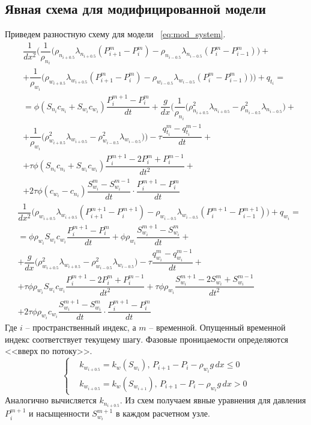 \subsection{Явная схема для модифицированной модели}
\label{mod_model_explicit}
Приведем разностную схему для модели ~\ref{eq:mod_system}.
\begin{eqnarray*} \label{eq:mod_scheme_p}
  & \dfrac{1}{dx^2} \bigg(\dfrac{1}{\rho_{n_i}} \big( \rho_{n_{i+0.5}} \lambda_{n_{i+0.5}} (P_{i+1}^m - P_i^m)
  - \rho_{n_{i-0.5}} \lambda_{n_{i-0.5}} (P_i^m - P_{i-1}^m)\big) + \\
  &+ \dfrac{1}{\rho_{w_i}} \big( \rho_{w_{i+0.5}} \lambda_{w_{i+0.5}} (P_{i+1}^m - P_i^m)
  - \rho_{w_{i-0.5}} \lambda_{w_{i-0.5}} (P_i^m - P_{i-1}^m)\big)\bigg) + q_{t_i} = \\
  &= \phi(S_{n_i}c_{n_i}+S_{w_i}c_{w_i}) \dfrac{P_i^{m+1} - P_i^m}{dt}
  + \dfrac{g}{dx} \bigg(\dfrac{1}{\rho_{n_i}} \big( \rho_{n_{i+0.5}}^2 \lambda_{n_{i+0.5}} 
  - \rho_{n_{i-0.5}}^2 \lambda_{n_{i-0.5}} \big) + \\
  &+ \dfrac{1}{\rho_{w_i}} \big( \rho_{w_{i+0.5}}^2 \lambda_{w_{i+0.5}} 
  - \rho_{w_{i-0.5}}^2 \lambda_{w_{i-0.5}} \big)\bigg)
  - \tau \dfrac{q_{t_i}^m-q_{t_i}^{m-1}}{dt} + \\
  &+ \tau \phi (S_{n_i}c_{n_i}+S_{w_i}c_{w_i}) \dfrac{P_i^{m+1}-2P_i^m+P_i^{m-1}}{dt^2} +\\
  &+ 2 \tau \phi (c_{w_i}-c_{n_i}) \dfrac{S_{w_i}^m-S_{w_i}^{m-1}}{dt} \cdot \dfrac{P_i^{m+1}-P_i^m}{dt}
\end{eqnarray*}
\begin{eqnarray*} \label{eq:mod_scheme_p}
  & \dfrac{1}{dx^2} \bigg(\rho_{w_{i+0.5}} \lambda_{w_{i+0.5}} (P_{i+1}^{m+1} - P_i^{m+1})
  - \rho_{w_{i-0.5}} \lambda_{w_{i-0.5}} (P_i^{m+1} - P_{i-1}^{m+1}) \bigg) + q_{w_i} = \\
  &= \phi\rho_{w_i}S_{w_i}c_{w_i} \dfrac{P_i^{m+1} - P_i^m}{dt} + \phi\rho_{w_i} \dfrac{S_{w_i}^{m+1} - S_{w_i}^m}{dt} +\\ 
  &+ \dfrac{g}{dx} \bigg(\rho_{w_{i+0.5}}^2 \lambda_{w_{i+0.5}} - \rho_{w_{i-0.5}}^2 \lambda_{w_{i-0.5}} \bigg)
  - \tau \dfrac{q_{w_i}^m-q_{w_i}^{m-1}}{dt} + \\
  &+ \tau \phi \rho_{w_i}S_{w_i}c_{w_i} \dfrac{P_i^{m+1}-2P_i^m+P_i^{m-1}}{dt^2}
  + \tau \phi \rho_{w_i} \dfrac{S_{w_i}^{m+1}-2S_{w_i}^m+S_{w_i}^{m-1}}{dt^2} \\
  &+ 2 \tau \phi \rho_{w_i} c_{w_i} \dfrac{S_{w_i}^{m+1}-S_{w_i}^{m}}{dt} \cdot \dfrac{P_i^{m+1}-P_i^m}{dt}
\end{eqnarray*}
Где $i$ -- пространственный индекс, а $m$ -- временной. Опущенный временной индекс соответствует текущему шагу.
Фазовые проницаемости определяются <<вверх по потоку>>.
\begin{equation}
 \begin{cases}
  &k_{w_{i+0.5}} = k_w(S_{w_i}),\, P_{i+1}-P_i-\rho_{w_i}g\,dx \le 0
  \\
  &k_{w_{i+0.5}} = k_w(S_{w_{i+1}}),\, P_{i+1}-P_i-\rho_{w_i}g\,dx > 0
 \end{cases}
\end{equation}
Аналогично вычисляется $k_{n_{i+0.5}}$.
Из схем получаем явные уравнения для давления $P_i^{m+1}$ и насыщенности $S_{w_i}^{m+1}$
в каждом расчетном узле. 

